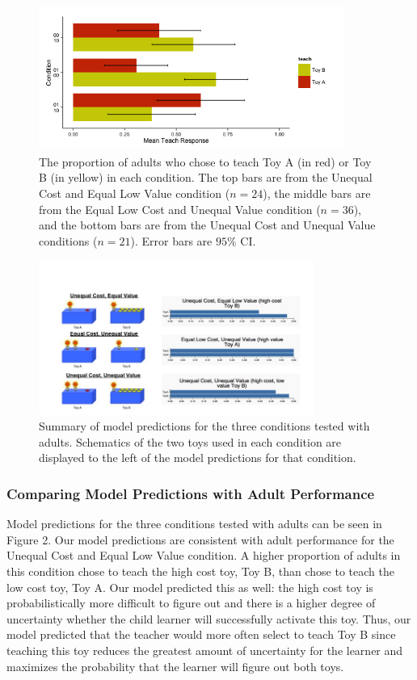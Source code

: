 \documentclass[10pt,letterpaper]{article}
\begin{document}
\begin{figure}[ht]
\begin{center}
\includegraphics[width=10cm]{teach_n=81_horizontalBar.png}
\end{center}
\caption{The proportion of adults who chose to teach Toy A (in red) or Toy B (in yellow) in each condition. The top bars are from the Unequal Cost and Equal Low Value condition ($n = 24$), the middle bars are from the Equal Low Cost and Unequal Value condition ($n = 36$), and the bottom bars are from the Unequal Cost and Unequal Value conditions ($n = 21$). Error bars are $95\%$ CI.} 
\label{Figure 1}
\end{figure}

\begin{figure}[ht]
\begin{center}
\includegraphics[width=9cm]{modelPredictions.png}
\end{center}
\caption{Summary of model predictions for the three conditions tested with adults. Schematics of the two toys used in each condition are displayed to the left of the model predictions for that condition.} 
\label{Figure 2}
\end{figure}

\subsubsection{Comparing Model Predictions with Adult Performance}
Model predictions for the three conditions tested with adults can be seen in Figure 2. Our model predictions are consistent with adult performance for the Unequal Cost and Equal Low Value condition. A higher proportion of adults in this condition chose to teach the high cost toy, Toy B, than chose to teach the low cost toy, Toy A. Our model predicted this as well: the high cost toy is probabilistically more difficult to figure out and there is a higher degree of uncertainty whether the child learner will successfully activate this toy. Thus, our model predicted that the teacher would more often select to teach Toy B since teaching this toy reduces the greatest amount of uncertainty for the learner and maximizes the probability that the learner will figure out both toys. 
\end{document}
